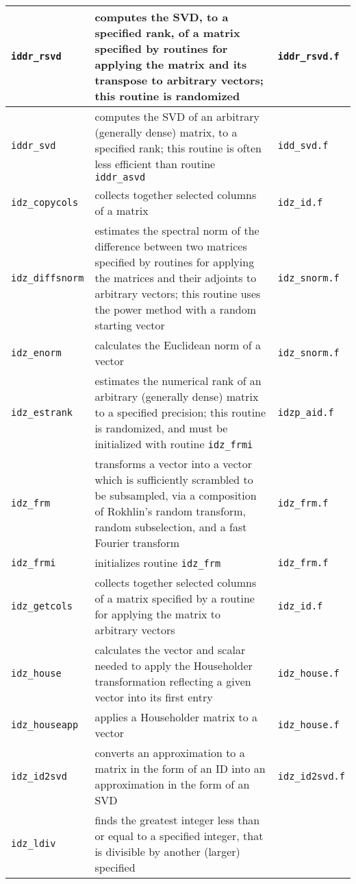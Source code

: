 ﻿\documentclass[letterpaper,12pt]{article}
\begin{document}
\begin{center}
\begin{supertabular}{>{\raggedright}p{1.2in} p{.53\textwidth} l}
%
{\tt iddr\_rsvd} & computes the SVD, to a specified rank, of a matrix
specified by routines for applying the matrix and its transpose to
arbitrary vectors; this routine is randomized & {\tt iddr\_rsvd.f}
\\\hline
%
{\tt iddr\_svd} & computes the SVD of an arbitrary (generally dense)
matrix, to a specified rank; this routine is often less efficient than
routine {\tt iddr\_asvd} & {\tt idd\_svd.f} \\\hline
%
{\tt idz\_copycols} & collects together selected columns of a matrix &
{\tt idz\_id.f} \\\hline
%
{\tt idz\_diffsnorm} & estimates the spectral norm of the difference
between two matrices specified by routines for applying the matrices
and their adjoints to arbitrary vectors; this routine uses the power
method with a random starting vector & {\tt idz\_snorm.f} \\\hline
%
{\tt idz\_enorm} & calculates the Euclidean norm of a vector &
{\tt idz\_snorm.f} \\\hline
%
{\tt idz\_estrank} & estimates the numerical rank of an arbitrary
(generally dense) matrix to a specified precision; this routine is
randomized, and must be initialized with routine {\tt idz\_frmi} &
{\tt idzp\_aid.f} \\\hline
%
{\tt idz\_frm} & transforms a vector into a vector which is
sufficiently scrambled to be subsampled, via a composition of Rokhlin's
random transform, random subselection, and a fast Fourier transform &
{\tt idz\_frm.f} \\\hline
%
{\tt idz\_frmi} & initializes routine {\tt idz\_frm} & {\tt idz\_frm.f}
\\\hline
%
{\tt idz\_getcols} & collects together selected columns of a matrix
specified by a routine for applying the matrix to arbitrary vectors &
{\tt idz\_id.f} \\\hline
%
{\tt idz\_house} & calculates the vector and scalar needed to apply the
Householder transformation reflecting a given vector into its first
entry & {\tt idz\_house.f} \\\hline
%
{\tt idz\_houseapp} & applies a Householder matrix to a vector &
{\tt idz\_house.f} \\\hline
%
{\tt idz\_id2svd} & converts an approximation to a matrix in the form
of an ID into an approximation in the form of an SVD &
{\tt idz\_id2svd.f} \\\hline
%
{\tt idz\_ldiv} & finds the greatest integer less than or equal to a
specified integer, that is divisible by another (larger) specified

\end{supertabular}
\end{center}
\end{document}
